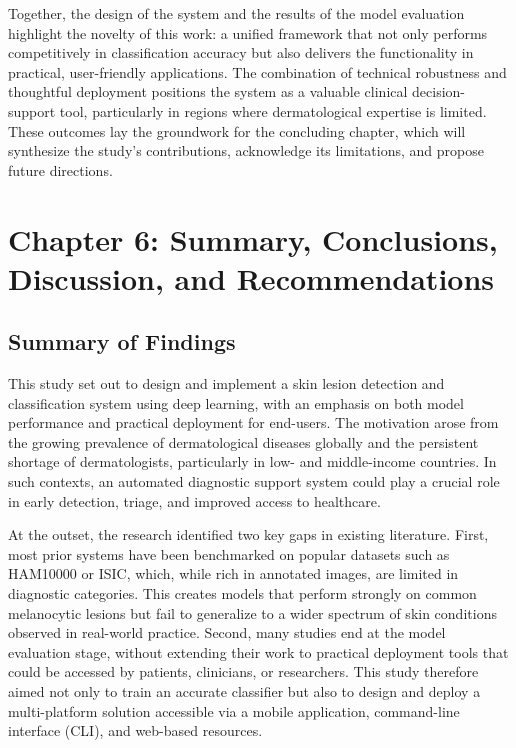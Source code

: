 \documentclass[
  12pt,
  oneside]{article}
\begin{document}
Together, the design of the system and the results of the model
evaluation highlight the novelty of this work: a unified framework that
not only performs competitively in classification accuracy but also
delivers the functionality in practical, user-friendly applications. The
combination of technical robustness and thoughtful deployment positions
the system as a valuable clinical decision-support tool, particularly in
regions where dermatological expertise is limited. These outcomes lay
the groundwork for the concluding chapter, which will synthesize the
study's contributions, acknowledge its limitations, and propose future
directions.

\newpage

\section{Chapter 6: Summary, Conclusions, Discussion, and
Recommendations}\label{chapter-6-summary-conclusions-discussion-and-recommendations}

\subsection{Summary of Findings}\label{summary-of-findings}

This study set out to design and implement a skin lesion detection and
classification system using deep learning, with an emphasis on both
model performance and practical deployment for end-users. The motivation
arose from the growing prevalence of dermatological diseases globally
and the persistent shortage of dermatologists, particularly in low- and
middle-income countries. In such contexts, an automated diagnostic
support system could play a crucial role in early detection, triage, and
improved access to healthcare.

At the outset, the research identified two key gaps in existing
literature. First, most prior systems have been benchmarked on popular
datasets such as HAM10000 or ISIC, which, while rich in annotated
images, are limited in diagnostic categories. This creates models that
perform strongly on common melanocytic lesions but fail to generalize to
a wider spectrum of skin conditions observed in real-world practice.
Second, many studies end at the model evaluation stage, without
extending their work to practical deployment tools that could be
accessed by patients, clinicians, or researchers. This study therefore
aimed not only to train an accurate classifier but also to design and
deploy a multi-platform solution accessible via a mobile application,
command-line interface (CLI), and web-based resources.
\end{document}
